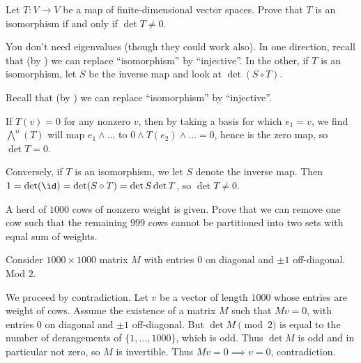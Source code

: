 \begin{problem}
	Let $T \colon V \to V$ be a map of finite-dimensional vector spaces.
	Prove that $T$ is an isomorphism
	if and only if $\det T \neq 0$.
	\begin{hint}
		You don't need eigenvalues (though they could work also).
		In one direction, recall that (by )
		we can replace ``isomorphism'' by ``injective''.
		In the other, if $T$ is an isomorphism,
		let $S$ be the inverse map and look at $\det(S \circ T)$.
	\end{hint}
	\begin{sol}
		Recall that (by \Cref{prob:equal_dimension})
		we can replace ``isomorphism'' by ``injective''.

		If $T(v) = 0$ for any nonzero $v$,
		then by taking a basis for which $e_1 = v$,
		we find $\bigwedge^n(T)$ will map $e_1 \wedge \dots$
		to $0 \wedge T(e_2) \wedge \dots = 0$,
		hence is the zero map, so $\det T = 0$.

		Conversely, if $T$ is an isomorphism,
		we let $S$ denote the inverse map.
		Then $1 = \det(\id) = \det(S \circ T) = \det S \det T$,
		so $\det T \neq 0$.
	\end{sol}
\end{problem}

\begin{problem}
	\gim
	A herd of $1000$ cows of nonzero weight is given.
	Prove that we can remove one cow such that the remaining $999$ cows
	cannot be partitioned into two sets with equal sum of weights.
	\begin{hint}
		Consider $1000 \times 1000$ matrix $M$
		with entries $0$ on diagonal and $\pm 1$ off-diagonal.
		Mod $2$.
	\end{hint}
	\begin{sol}
		We proceed by contradiction.
		Let $v$ be a vector of length $1000$
		whose entries are weight of cows.
		Assume the existence of a matrix $M$ such that $Mv = 0$,
		with entries $0$ on diagonal and $\pm 1$ off-diagonal.
		But $\det M \pmod 2$ is equal to the number of derangements
		of $\{1, \dots, 1000\}$, which is odd.
		Thus $\det M$ is odd and in particular not zero,
		so $M$ is invertible.
		Thus $Mv = 0 \implies v = 0$, contradiction.
	\end{sol}
\end{problem}

